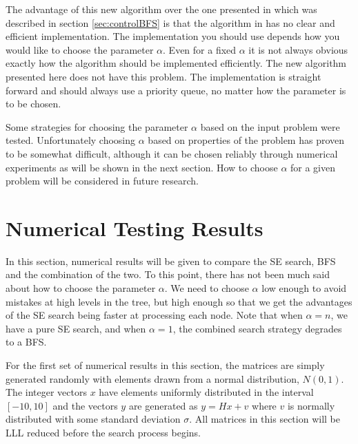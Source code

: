 \documentclass[12pt,Bold,letterpaper]{mcgilletdclass}
\newcommand{\vsp}{\vspace{\baselineskip}}
\begin{document}
The advantage of this new algorithm over the one presented in \cite{StuBF07} which was described in section \ref{sec:controlBFS} is that the algorithm in \cite{StuBF07} has no clear and efficient implementation. The implementation you should use depends how you would like to choose the parameter $\alpha$. Even for a fixed $\alpha$ it is not always obvious exactly how the algorithm should be implemented efficiently. The new algorithm presented here does not have this problem. The implementation is straight forward and should always use a priority queue, no matter how the parameter is to be chosen.

Some strategies for choosing the parameter $\alpha$ based on the input problem were tested. Unfortunately choosing $\alpha$ based on properties of the problem has proven to be somewhat difficult, although it can be chosen reliably through numerical experiments as will be shown in the next section. How to choose $\alpha$ for a given problem will be considered in future research.

\vsp \section{Numerical Testing Results} \label{sub:SearchResults}
In this section, numerical results will be given to compare the SE search, BFS and the combination of the two. To this point, there has not been much said about how to choose the parameter $\alpha$. We need to choose $\alpha$ low enough to avoid mistakes at high levels in the tree, but high enough so that we get the advantages of the SE search being faster at processing each node. Note that when $\alpha = n$, we have a pure SE search, and when $\alpha = 1$, the combined search strategy degrades to a BFS. 

For the first set of numerical results in this section, the matrices are simply generated randomly with elements drawn from a normal distribution, $N(0,1)$. The integer vectors $x$ have elements uniformly distributed in the interval $[-10,10]$ and the vectors $y$ are generated as $y = Hx+v$ where $v$ is normally distributed with some standard deviation $\sigma$. All matrices in this section will be LLL reduced before the search process begins.
\end{document}
